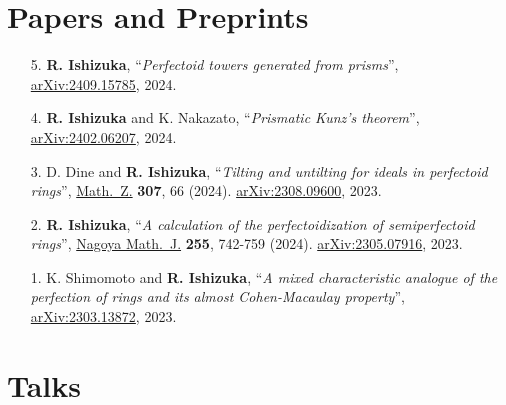 \documentclass[10pt,a4paper,sans]{moderncv}
\begin{document}
\section{Papers and Preprints}
\begin{enumerate}
  \item[5.] \textbf{R. Ishizuka}, ``\emph{Perfectoid towers generated from prisms}'', \href{https://arxiv.org/abs/2409.15785}{arXiv:2409.15785}, 2024.

  \item[4.] \textbf{R. Ishizuka} and K. Nakazato, ``\emph{Prismatic Kunz's theorem}'', \href{https://arxiv.org/abs/2402.06207}{arXiv:2402.06207}, 2024.

  \item[3.] D. Dine and \textbf{R. Ishizuka}, ``\emph{Tilting and untilting for ideals in perfectoid rings}'', \href{https://doi.org/10.1007/s00209-024-03537-1}{Math.\ Z.} \textbf{307}, 66 (2024). \href{https://arxiv.org/abs/2308.09600}{arXiv:2308.09600}, 2023.

  \item[2.] \textbf{R. Ishizuka}, ``\emph{A calculation of the perfectoidization of semiperfectoid rings}'', \href{https://doi.org/10.1017/nmj.2024.2}{Nagoya Math.\ J.} \textbf{255}, 742-759 (2024). \href{https://arxiv.org/abs/2305.07916}{arXiv:2305.07916}, 2023.

  \item[1.] K. Shimomoto and \textbf{R. Ishizuka}, ``\emph{A mixed characteristic analogue of the perfection of rings and its almost Cohen-Macaulay property}'', \href{https://arxiv.org/abs/2303.13872}{arXiv:2303.13872}, 2023.
\end{enumerate}





\section{Talks}
\end{document}
